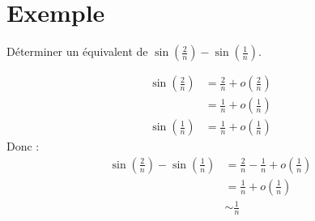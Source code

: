 \documentclass[../main.tex]{subfiles}
\begin{document}
\section{Exemple}
\begin{tcolorbox}[title=Exemple 24.36, title filled=false, colframe=darkgreen, colback=darkgreen!10!white]
    Déterminer un équivalent de $\sin\left(\frac{2}{n}\right)-\sin\left(\frac{1}{n}\right)$. 
\end{tcolorbox}

\begin{align*}
    \sin\left(\frac{2}{n}\right) &= \frac{2}{n} + o\left(\frac{2}{n}\right) \\
    &= \frac{1}{n} + o\left(\frac{1}{n}\right) \\
    \sin\left(\frac{1}{n}\right) &= \frac{1}{n} + o\left(\frac{1}{n}\right)
\end{align*}
Donc : 
\begin{align*}
    \sin\left(\frac{2}{n}\right) - \sin\left(\frac{1}{n}\right) &= \frac{2}{n} - \frac{1}{n} + o\left(\frac{1}{n}\right) \\
    &= \frac{1}{n} + o\left(\frac{1}{n}\right) \\
    &\sim \frac{1}{n}
\end{align*}
\end{document}

